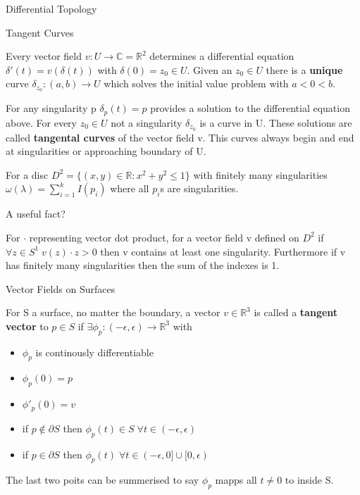 \documentclass[12pt, letterpaper]{article}
\begin{document}
\begin{section}{Differential Topology}
  \begin{subsection}{Tangent Curves}

    Every vector field \(v: U \to \mathbb{C} = \mathbb{R}^{2}\) determines a
    differential equation \(\delta'(t) = v(\delta(t))\) with \(\delta(0) = z_{0}
    \in U\). Given an \(z_{0} \in U\) there is a \textbf{unique} curve \(\delta_{z_{0}}
    : (a, b) \to U\) which solves the initial value problem with \(a < 0 < b\).

    For any singularity p \(\delta_{p}(t) = p\) provides a solution to the
    differential equation above. For every \(z_{0} \in U\) not a singularity
    \(\delta_{z_{0}}\) is a curve in U. These solutions are called \textbf{tangental
      curves} of the vector field v. This curves always begin and end at
    singularities or approaching boundary of U.

    For a disc \(D^{2} = \{ (x, y) \in \mathbb{R} : x^{2} + y^{2} \leq 1\}\)
    with finitely many singularities \(\omega(\lambda) = \sum^{k}_{i = 1}I(p_{i})\)
    where all \(p_{i}\)s are singularities.

  \end{subsection}

  \begin{subsection}{A useful fact?}

    For \(\cdot\) representing vector dot product, for a vector field v defined
    on \(D^{2}\) if \(\forall z \in S^{1} \; v(z) \cdot z > 0\) then v contains
    at least one singularity. Furthermore if v has finitely many singularities
    then the sum of the indexes is 1.

  \end{subsection}

  \begin{subsection}{Vector Fields on Surfaces}

    For S a surface, no matter the boundary, a vector \(v \in \mathbb{R}^{3}\)
    is called a \textbf{tangent vector} to \(p \in S\) if \(\exists \phi_{p}
    : (-\epsilon, \epsilon) \to \mathbb{R}^{3}\) with
    \begin{itemize}
      \item \(\phi_{p}\) is continously differentiable
      \item \(\phi_{p}(0) = p\)
      \item \(\phi'_{p}(0) = v\)
      \item if \(p \notin \partial S\) then \(\phi_{p}(t) \in S \;
            \forall t \in (-\epsilon,\epsilon)\)
      \item if \(p \in \partial S\) then \(\phi_{p}(t) \;
            \forall t \in (-\epsilon, 0] \cup [0, \epsilon)\)
    \end{itemize}
    The last two poits can be summerised to say \(\phi_{p}\) mapps all \(t \neq 0\)
    to inside S.


\end{subsection}
\end{section}
\end{document}
